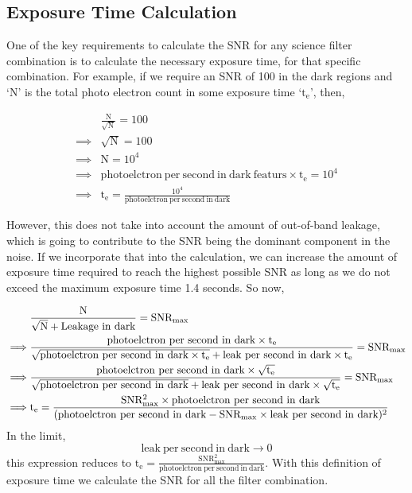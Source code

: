 \subsection{Exposure Time Calculation}
One of the key requirements to calculate the SNR for any science filter combination is to calculate the necessary exposure time, for that specific combination. For example, if we require an SNR of 100 in the dark regions and `N' is the total photo electron count in some exposure time `$\mathrm{t_{e}}$', then,

\begin{align*}
    & \mathrm{\frac{N}{\sqrt{N}} = 100} \\
    \implies & \mathrm{\sqrt{N} = 100} \\
    \implies & \mathrm{N = 10^{4}} \\
    \implies & \mathrm{photoelctron~per~second~in~dark~featurs \times t_{e} = 10^{4}} \\
    \implies & \mathrm{t_{e} = \frac{10^{4}}{photoelctron~per~second~in~dark}}
\end{align*}

However, this does not take into account the amount of out-of-band leakage, which is going to contribute to the SNR being the dominant component in the noise. If we incorporate that into the calculation, we can increase the amount of exposure time required to reach the highest possible SNR as long as we do not exceed the maximum exposure time 1.4 seconds. So now,

\begin{align}
    & \mathrm{\frac{N}{\sqrt{N}+Leakage~in~dark} = SNR_{max}} \notag \\
    \implies & \mathrm{\frac{photoelctron~per~second~in~dark \times t_{e}}{\sqrt{photoelctron~per~second~in~dark \times t_{e}}+leak~per~second~in~dark \times t_{e}} = SNR_{max}} \notag \\
    \implies & \mathrm{\frac{photoelctron~per~second~in~dark \times \sqrt{t_{e}}}{\sqrt{photoelctron~per~second~in~dark}+leak~per~second~in~dark \times \sqrt{t_{e}}} = SNR_{max}} \notag \\
    \implies & \mathrm{t_{e} = \frac{SNR_{max}^{2} \times photoelctron~per~second~in~dark}{(photoelctron~per~second~in~dark-SNR_{max} \times leak~per~second~in~dark)^{2}}} \notag\\
\end{align}
In the limit, $$\mathrm{leak~per~second~in~dark \to 0}$$ this expression reduces to $\mathrm{t_{e} = \frac{SNR_{max}^{2}}{photoelctron~per~second~in~dark}}$. With this definition of exposure time we calculate the SNR for all the filter combination.

